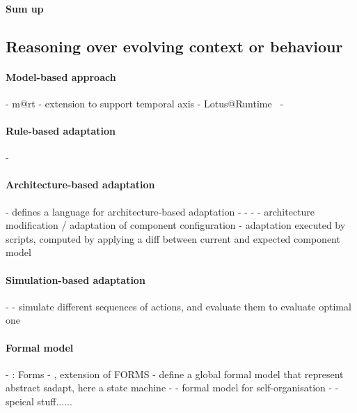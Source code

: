 	 
\paragraph{Sum up}	 

	 
\subsection{Reasoning over evolving context or behaviour}

\paragraph{Model-based approach}
- \gls{m@rt} \cite{DBLP:journals/computer/BlairBF09, DBLP:journals/computer/MorinBJFS09}
	- extension to support temporal axis \cite{DBLP:conf/seke/0001FNMKT14, DBLP:conf/models/0001FNMKBT14}
- Lotus@Runtime~\cite{DBLP:conf/icse/BarbosaLMJ17}
- \cite{DBLP:conf/icse/ChenPYNZ14}
		
\paragraph{Rule-based adaptation}
- \cite{DBLP:conf/icse/ArcainiRS15, DBLP:conf/icse/TaharaOH17, DBLP:conf/eurosys/GraceHPBCT08}

\paragraph{Architecture-based adaptation}
- \cite{DBLP:journals/jss/ChengG12} defines a language for architecture-based adaptation
- \cite{DBLP:journals/computer/GarlanCHSS04}
- \cite{DBLP:journals/computer/GeorgasHT09}
- \cite{DBLP:conf/cbse/FouquetMFBPJ12}
	- architecture modification / adaptation of component configuration
	- adaptation executed by scripts, computed by applying a diff between current and expected component model

\paragraph{Simulation-based adaptation}
- \cite{DBLP:conf/smartgridsec/0001FKNT14}
	- simulate different sequences of actions, and evaluate them to evaluate optimal one

\paragraph{Formal model}
- \cite{DBLP:journals/taas/WeynsMA12}: Forms
- \cite{DBLP:conf/icse/IftikharW14a}, extension of FORMS
	- define a global formal model that represent abstract \gls{sadapt}, here a state machine
- \cite{DBLP:journals/taas/WeynsHH10}
	- formal model for self-organisation
- \cite{DBLP:conf/icse/BartelsK11}
	- speical stuff......

